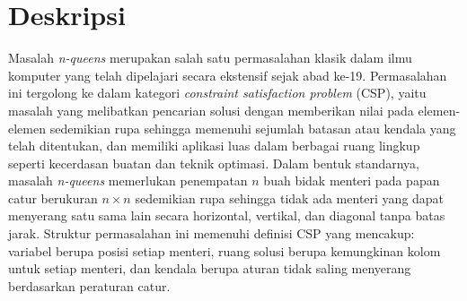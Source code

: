 \documentclass[a4paper,twoside]{article}
\begin{document}
	
	\title{\@judultopik}
	\author{\nama \textendash \@npm} 
	
	\newcommand{\nama}{Arlo Dante Hananvyasa}
	\newcommand{\@npm}{6182201010}
	\newcommand{\@judultopik}{Pembangunan Perangkat Lunak dan Penyelesaian Permainan Colored Queens} %
	\newcommand{\jumpemb}{1} %
	\newcommand{\tanggal}{\DTMtoday}
	
	
	\maketitle
	
	
	\section{Deskripsi}
	Masalah \textit{n-queens} merupakan salah satu permasalahan klasik dalam ilmu komputer yang telah dipelajari secara ekstensif sejak abad ke-19. Permasalahan ini tergolong ke dalam kategori \textit{constraint satisfaction problem} (CSP), yaitu masalah yang melibatkan pencarian solusi dengan memberikan nilai pada elemen-elemen sedemikian rupa sehingga memenuhi sejumlah batasan atau kendala yang telah ditentukan, dan memiliki aplikasi luas dalam berbagai ruang lingkup seperti kecerdasan buatan dan teknik optimasi. Dalam bentuk standarnya, masalah \textit{n-queens} memerlukan penempatan $n$ buah bidak menteri pada papan catur berukuran $n \times n$ sedemikian rupa sehingga tidak ada menteri yang dapat menyerang satu sama lain secara horizontal, vertikal, dan diagonal tanpa batas jarak. Struktur permasalahan ini memenuhi definisi CSP yang mencakup: variabel berupa posisi setiap menteri, ruang solusi berupa kemungkinan kolom untuk setiap menteri, dan kendala berupa aturan tidak saling menyerang berdasarkan peraturan catur.
	
\end{document}
